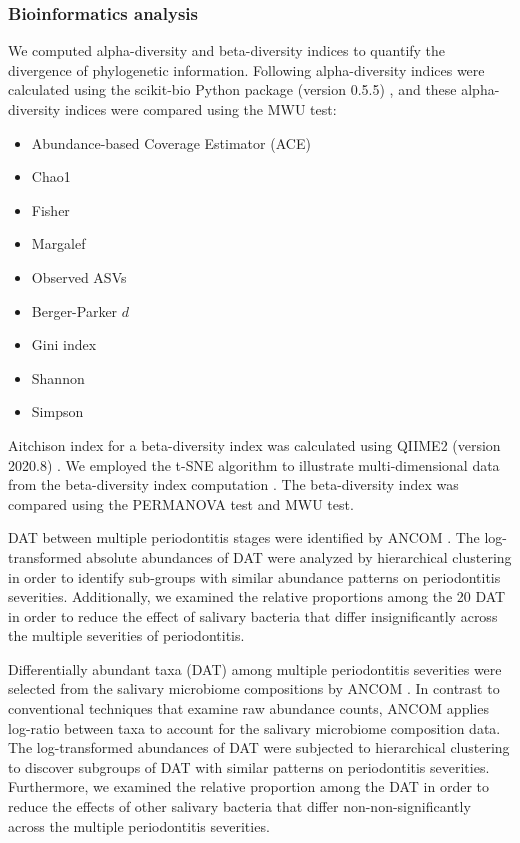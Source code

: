 \documentclass[11pt, a4paper, onecolumn, oneside]{report}
\begin{document}
            \subsubsection{Bioinformatics analysis}
                We computed alpha-diversity and beta-diversity indices to quantify the divergence of phylogenetic information. Following alpha-diversity indices were calculated using the scikit-bio Python package (version 0.5.5) \cite{scikit-bio-1}, and these alpha-diversity indices were compared using the MWU test:
                \begin{itemize}[noitemsep,nolistsep]
                    \item Abundance-based Coverage Estimator (ACE) \cite{ACE-1}
                    \item Chao1 \cite{chao1-1}
                    \item Fisher \cite{fisher-1}
                    \item Margalef \cite{margalef-1}
                    \item Observed ASVs \cite{observed-ASVs-1}
                    \item Berger-Parker $d$ \cite{Berger-1}
                    \item Gini index \cite{Gini-1}
                    \item Shannon \cite{Shannon-1}
                    \item Simpson \cite{Simpson-1}
                \end{itemize}

                Aitchison index for a beta-diversity index was calculated using QIIME2 (version 2020.8) \cite{Aitchison-1, QIIME2-1}. We employed the t-SNE algorithm to illustrate multi-dimensional data from the beta-diversity index computation \cite{tSNE-1}. The beta-diversity index was compared using the PERMANOVA test \cite{PERMANOVA-1, PERMANOVA-2} and MWU test.

                DAT between multiple periodontitis stages were identified by ANCOM \cite{ANCOM-1}. The log-transformed absolute abundances of DAT were analyzed by hierarchical clustering in order to identify sub-groups with similar abundance patterns on periodontitis severities. Additionally, we examined the relative proportions among the 20 DAT in order to reduce the effect of salivary bacteria that differ insignificantly across the multiple severities of periodontitis.

                Differentially abundant taxa (DAT) among multiple periodontitis severities were selected from the salivary microbiome compositions by ANCOM \cite{ANCOM-1}. In contrast to conventional techniques that examine raw abundance counts, ANCOM applies log-ratio between taxa to account for the salivary microbiome composition data. The log-transformed abundances of DAT were subjected to hierarchical clustering to discover subgroups of DAT with similar patterns on periodontitis severities. Furthermore, we examined the relative proportion among the DAT in order to reduce the effects of other salivary bacteria that differ non-non-significantly across the multiple periodontitis severities.
\end{document}
